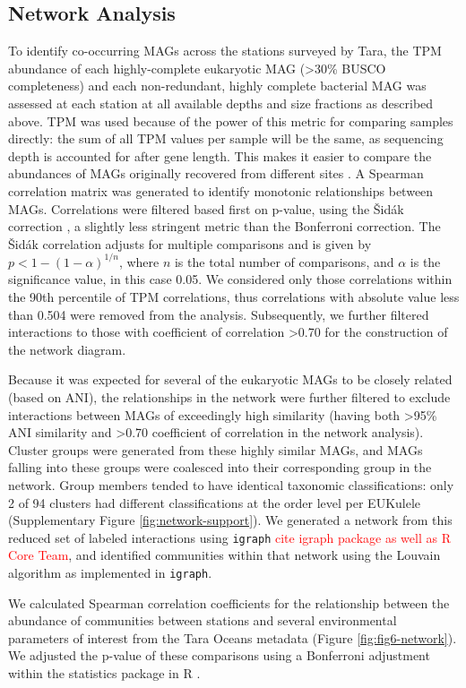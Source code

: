 \documentclass[12pt]{article}
\numberwithin{equation}{section}
\begin{document}
\subsection*{Network Analysis} 

To identify co-occurring MAGs across the stations surveyed by Tara, the TPM abundance of each highly-complete eukaryotic MAG (>30\% BUSCO completeness) and each non-redundant, highly complete bacterial MAG was assessed at each station at all available depths and size fractions as described above. TPM was used because of the power of this metric for comparing samples directly: the sum of all TPM values per sample will be the same, as sequencing depth is accounted for after gene length. This makes it easier to compare the abundances of MAGs originally recovered from different sites \citep{Gradoville_2017}. A Spearman correlation matrix was generated to identify monotonic relationships between MAGs. Correlations were filtered based first on p-value, using the Šidák correction \citep{Sidak_1967}, a slightly less stringent metric than the Bonferroni correction. The Šidák correlation adjusts for multiple comparisons and is given by $p < 1-(1-\alpha)^{1/n}$, where $n$ is the total number of comparisons, and $\alpha$ is the significance value, in this case 0.05. We considered only those correlations within the 90th percentile of TPM correlations, thus correlations with absolute value less than 0.504 were removed from the analysis. Subsequently, we further filtered interactions to those with coefficient of correlation >0.70 for the construction of the network diagram. 

Because it was expected for several of the eukaryotic MAGs to be closely related (based on ANI), the relationships in the network were further filtered to exclude interactions between MAGs of exceedingly high similarity (having both >95\% ANI similarity and >0.70 coefficient of correlation in the network analysis). Cluster groups were generated from these highly similar MAGs, and MAGs falling into these groups were coalesced into their corresponding group in the network. Group members tended to have identical taxonomic classifications: only 2 of 94 clusters had different classifications at the order level per EUKulele (Supplementary Figure \ref{fig:network-support}). We generated a network from this reduced set of labeled interactions using \texttt{igraph} \textcolor{red}{cite igraph package as well as R Core Team}, and identified communities within that network using the Louvain algorithm as implemented in \texttt{igraph}. 

We calculated Spearman correlation coefficients for the relationship between the abundance of communities between stations and several environmental parameters of interest from the Tara Oceans metadata \citep{taraoceansconsortium2014ross} (Figure \ref{fig:fig6-network}). We adjusted the p-value of these comparisons using a Bonferroni adjustment within the statistics package in R \citep{teamr}. 





\end{document}
